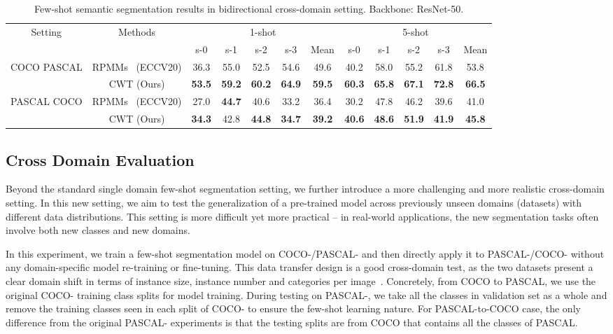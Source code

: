 \documentclass[10pt,twocolumn,letterpaper]{article}
\begin{document}
\begin{table*}[h]
\small
    \centering
    \begin{tabular}{c|c|ccccc|ccccc}
    \hline
    \hline
         \multirow{2}{*}{Setting} & \multirow{2}{*}{Methods} & \multicolumn{5}{c}{1-shot} & \multicolumn{5}{c}{5-shot}  \\
         \cline{3-12}
          & & s-0 & s-1 & s-2 & s-3 & Mean & s-0 & s-1 & s-2 & s-3 & Mean \\
         \hline
         \multirow{2}{*}{COCO  PASCAL} & RPMMs~\cite{yang2020prototype} (ECCV20) & 36.3 & 55.0 & 52.5 & 54.6 & 49.6 & 40.2 & 58.0 & 55.2 & 61.8 & 53.8 \\
         & CWT (Ours) & \textbf{53.5} & \textbf{59.2} & \textbf{60.2} & \textbf{64.9} & \textbf{59.5} & \textbf{60.3} & \textbf{65.8} & \textbf{67.1} & \textbf{72.8} & \textbf{66.5}  \\
         \hline
         \multirow{2}{*}{PASCAL  COCO} & RPMMs~\cite{yang2020prototype} (ECCV20) & 27.0 & \textbf{44.7} & 40.6 & 33.2 & 36.4 & 30.2 & 47.8 & 46.2 & 39.6 & 41.0 \\
         & CWT (Ours) & \textbf{34.3} & 42.8 & \textbf{44.8} & \textbf{34.7} & \textbf{39.2} & \textbf{40.6} & \textbf{48.6} & \textbf{51.9} & \textbf{41.9} & \textbf{45.8} \\
         \hline
         \hline
    \end{tabular}
    \vspace{2pt}
    \caption{Few-shot semantic segmentation results
    in bidirectional cross-domain setting.
    Backbone: ResNet-50.
    }
    \label{tab:main_cross}
\end{table*}

\subsection{Cross Domain Evaluation}
Beyond the standard single domain few-shot segmentation setting,
we further introduce a more challenging and more realistic cross-domain setting.
In this new setting, we aim to test the generalization of a pre-trained model across previously unseen domains (datasets) with different data distributions.
This setting is more difficult yet more practical -- in real-world applications, the new segmentation tasks often involve both new classes and new domains.


In this experiment, we train a few-shot segmentation model on COCO-/PASCAL- and then directly apply it to PASCAL-/COCO- without any domain-specific model re-training or fine-tuning.
This data transfer design is a good cross-domain test, as the two datasets present a clear domain shift in terms of instance size, instance number and categories per image~\cite{lin2014microsoft}.
Concretely, from COCO to PASCAL, we use the original COCO- training class splits
for model training.
During testing on PASCAL-, we take all the classes in validation set as a whole and remove the training classes seen in each split of COCO-
to ensure the few-shot learning nature. 
For PASCAL-to-COCO case, the only difference from the original PASCAL- experiments is that the testing splits are from COCO that contains all the classes of PASCAL.
\end{document}

